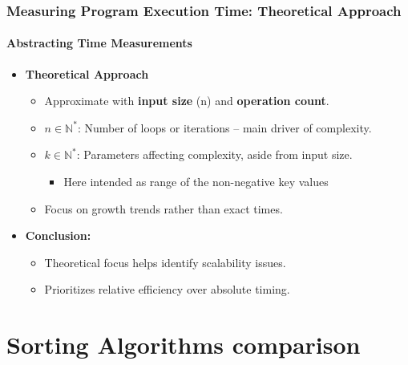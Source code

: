 \documentclass[compress,12pt,bookmark]{beamer}
\begin{document}
\begin{frame}
    \frametitle{Measuring Program Execution Time: Theoretical Approach}
    \framesubtitle{Abstracting Time Measurements}

    \begin{itemize}
        \item \textbf{Theoretical Approach}
              \begin{itemize}
                  \item Approximate with \textbf{input size} (n) and \textbf{operation count}.
                  \item $n \in \mathbb{N}^*$: Number of loops or iterations -- main driver of complexity.
                  \item $k \in \mathbb{N}^*$: Parameters affecting complexity, aside from input size.
                        \begin{itemize}
                            \item Here intended as range of the non-negative key values
                        \end{itemize}
                  \item Focus on growth trends rather than exact times.
              \end{itemize}
        \item \textbf{Conclusion:}
              \begin{itemize}
                  \item Theoretical focus helps identify scalability issues.
                  \item Prioritizes relative efficiency over absolute timing.
              \end{itemize}
    \end{itemize}
\end{frame}

\section{Sorting Algorithms comparison}
\end{document}
